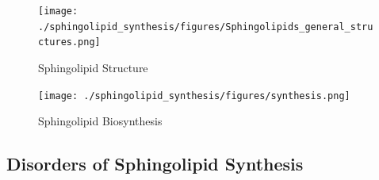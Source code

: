 \documentclass{scrartcl}
\begin{document}
\begin{enumerate}
\begin{enumerate}
\begin{figure}[htbp]
\centering
\texttt{[image: ./sphingolipid\_synthesis/figures/Sphingolipids\_general\_structures.png]}
\caption[Sphingolipid Structure]{\label{fig:org0c06a2a}
Sphingolipid Structure}
\end{figure}


\begin{figure}[htbp]
\centering
\texttt{[image: ./sphingolipid\_synthesis/figures/synthesis.png]}
\caption[Sphingolipid Biosynthesis]{\label{fig:orgba7106b}
Sphingolipid Biosynthesis}
\end{figure}
\end{enumerate}
\end{enumerate}

\subsection{Disorders of Sphingolipid Synthesis}
\label{sec:orga5daec7}
\end{document}
